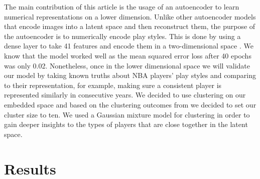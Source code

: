 \documentclass[12pt, letterpaper, titlepage]{article}
\begin{document}
The main contribution of this article is the usage of an autoencoder to learn numerical representations on a lower dimension. Unlike other autoencoder models that encode images into a latent space and then reconstruct them, the purpose of the autoencoder is to numerically encode play styles. This is done by using a dense layer to take 41 features and encode them in a two-dimensional space \citep{tensorflow2015-whitepaper}. We know that the model worked well as the mean squared error loss after 40 epochs was only 0.02. Nonetheless, once in the lower dimensional space we will validate our model by taking known truths about NBA players’ play styles and comparing to their representation, for example, making sure a consistent player is represented similarly in consecutive years.  
We decided to use clustering on our embedded space and based on the clustering outcomes from \citet{muniz2022weighted} we decided to set our cluster size to ten.  We used a Gaussian mixture model for clustering in order to gain deeper insights to the types of players that are close together in the latent space.


\section{Results}
\end{document}
